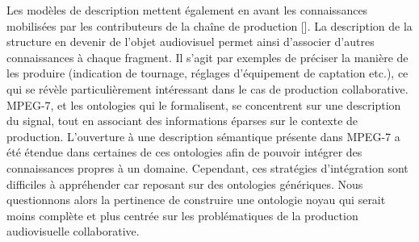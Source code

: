 Les modèles de description  mettent également en avant les connaissances mobilisées par les contributeurs de la chaîne de production [].
La description de la structure en devenir de l'objet audiovisuel permet ainsi d'associer d'autres connaissances à chaque fragment. Il s'agit par exemples de préciser la manière de les produire (indication de tournage, réglages d'équipement de captation etc.), ce qui se révèle particulièrement intéressant dans le cas de production collaborative.
MPEG-7, et les ontologies qui le formalisent, se concentrent sur une description du signal, tout en associant des informations éparses sur le contexte de production.
L'ouverture à une description sémantique présente dans MPEG-7 a été étendue dans certaines de ces ontologies afin de pouvoir intégrer des connaissances propres à un domaine.
Cependant, ces stratégies d'intégration sont difficiles à appréhender car reposant sur des ontologies génériques. 
Nous questionnons alors la pertinence de construire une ontologie noyau qui serait moins complète et plus centrée sur les problématiques de la production audiovisuelle collaborative.







